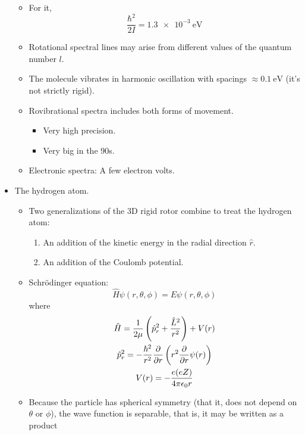 \documentclass[../notes.tex]{subfiles}
\begin{document}
\begin{itemize}
    \begin{itemize}
        \item For it,
        \begin{equation*}
            \frac{\hbar^2}{2I} = \SI{1.3e-3}{\electronvolt}
        \end{equation*}
        \item Rotational spectral lines may arise from different values of the quantum number $l$.
        \item The molecule vibrates in harmonic oscillation with spacings $\approx\SI{0.1}{\electronvolt}$ (it's not strictly rigid).
        \item Rovibrational spectra includes both forms of movement.
        \begin{itemize}
            \item Very high precision.
            \item Very big in the 90s.
        \end{itemize}
        \item Electronic spectra: A few electron volts.
    \end{itemize}
    \item The hydrogen atom.
    \begin{itemize}
        \item Two generalizations of the 3D rigid rotor combine to treat the hydrogen atom:
        \begin{enumerate}
            \item An addition of the kinetic energy in the radial direction $\hat{r}$.
            \item An addition of the Coulomb potential.
        \end{enumerate}
        \item Schr\"{o}dinger equation:
        \begin{equation*}
            \hat{H}\psi(r,\theta,\phi) = E\psi(r,\theta,\phi)
        \end{equation*}
        where
        \begin{gather*}
            \hat{H} = \frac{1}{2\mu}\left( \hat{p}_r^2+\frac{\hat{L}^2}{r^2} \right)+V(r)\\
            \hat{p}_r^2 = -\frac{\hbar^2}{r^2}\pdv{r}\left( r^2\pdv{r}\psi(r) \right)\\
            V(r) = -\frac{e(eZ)}{4\pi\epsilon_0r}
        \end{gather*}
        \item Because the particle has spherical symmetry (that it, does not depend on $\theta$ or $\phi$), the wave function is separable, that is, it may be written as a product

\end{itemize}
\end{itemize}
\end{document}
